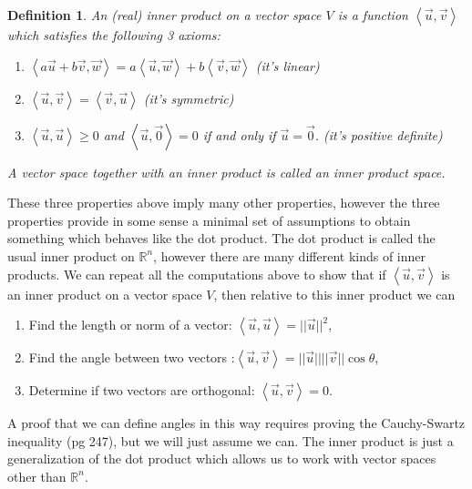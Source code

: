 \documentclass[10pt]{article}
\theoremstyle{plain}
\theoremstyle{box}
\newtheorem{definition}{Definition}
\newcommand{\R}{{\mathbb{R}}}
\begin{document}
\begin{definition}
An (real) inner product on a vector space $V$ is a function $\left<\vec u,\vec v\right>$ which satisfies the following 3 axioms:
\begin{enumerate}
	\item $\left<a\vec u +b\vec v,\vec w\right> = a\left<\vec u,\vec w\right> +b\left<\vec v,\vec w\right> $ (it's linear)
	\item $\left<\vec u,\vec v\right> = \left<\vec v,\vec u\right>$ (it's symmetric) 
 	\item $\left<\vec u,\vec u\right> \geq 0$ and $\left<\vec u,\vec 0\right> =0$ if and only if $\vec u = \vec 0$. (it's positive definite)
\end{enumerate}
A vector space together with an inner product is called an inner product space.
\end{definition}
These three properties above imply many other properties, however the three properties provide in some sense a minimal set of assumptions to obtain something which behaves like the dot product.  The dot product is called the usual inner product on $\R^n$, however there are many different kinds of inner products. We can repeat all the computations above to show that if $\left<\vec u,\vec v\right>$ is an inner product on a vector space $V$, then relative to this inner product we can 
\begin{enumerate}
	\item Find the length or norm of a vector: $\left<\vec u , \vec u\right>=||\vec u ||^2$,
	\item Find the angle between two vectors :$\left<\vec u , \vec v\right>= ||\vec u|| ||\vec v||\cos \theta$,
	\item Determine if two vectors are orthogonal: $\left<\vec u , \vec v\right> = 0$.
\end{enumerate}
A proof that we can define angles in this way requires proving the Cauchy-Swartz inequality (pg 247), but we will just assume we can. The inner product is just a generalization of the dot product which allows us to work with vector spaces other than $\R^n$. 
\end{document}
